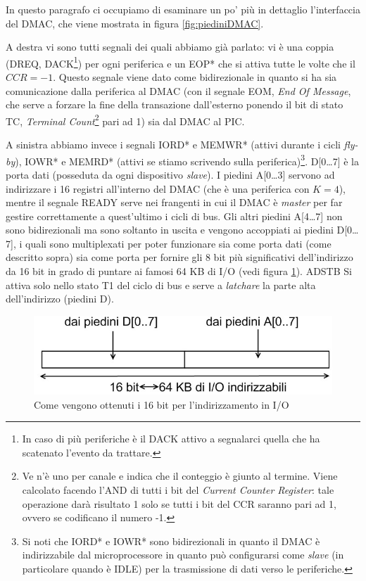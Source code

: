 In questo paragrafo ci occupiamo di esaminare un po' più in dettaglio l'interfaccia del DMAC, che viene mostrata in figura \ref{fig:piediniDMAC}.


A destra vi sono tutti segnali dei quali abbiamo già parlato: vi è una coppia (DREQ, DACK\footnote{In caso di più periferiche è il DACK attivo a segnalarci quella che ha scatenato l'evento da trattare.}) per ogni periferica e un EOP* che si attiva tutte le volte che il $CCR=-1$. Questo segnale viene dato come bidirezionale in quanto si ha sia comunicazione dalla periferica al DMAC (con il segnale EOM, \textit{End Of Message}, che serve a forzare la fine della transazione dall'esterno ponendo il bit di stato TC, \textit{Terminal Count}\footnote{Ve n'è uno per canale e indica che il conteggio è giunto al termine. Viene calcolato facendo l'AND di tutti i bit del \textit{Current Counter Register}: tale operazione darà risultato 1 solo se tutti i bit del CCR saranno pari ad 1, ovvero se codificano il numero -1.} pari ad 1) sia dal DMAC al PIC.


A sinistra abbiamo invece i segnali IORD* e MEMWR* (attivi durante i cicli \textit{fly-by}), IOWR* e MEMRD* (attivi se stiamo scrivendo sulla periferica)\footnote{Si noti che IORD* e IOWR* sono bidirezionali in quanto il DMAC è indirizzabile dal microprocessore in quanto può configurarsi come \textit{slave} (in particolare quando è IDLE) per la trasmissione di dati verso le periferiche.}.
D[0\ldots 7] è la porta dati (posseduta da ogni dispositivo \textit{slave}).
I piedini A[0\ldots 3] servono ad indirizzare i 16 registri all'interno del DMAC (che è una periferica con $K=4$), mentre il segnale READY serve nei frangenti in cui il DMAC è \textit{master} per far gestire correttamente a quest'ultimo i cicli di bus. Gli altri piedini A[4\ldots 7] non sono bidirezionali ma sono soltanto in uscita e vengono accoppiati ai piedini D[0\ldots 7], i quali sono multiplexati per poter funzionare sia come porta dati (come descritto sopra) sia come porta per fornire gli 8 bit più significativi dell'indirizzo da 16 bit in grado di puntare ai famosi 64 KB di I/O (vedi figura \ref{fig:comeFare16bit}). ADSTB Si attiva solo nello stato T1 del ciclo di bus e serve a \textit{latchare} la parte alta dell'indirizzo (piedini D).

\begin{figure}[!h]
\centering
\includegraphics[width=0.55\columnwidth]{img/comeFare16bit}
\caption{Come vengono ottenuti i 16 bit per l'indirizzamento in I/O}
\label{fig:comeFare16bit}
\end{figure}

